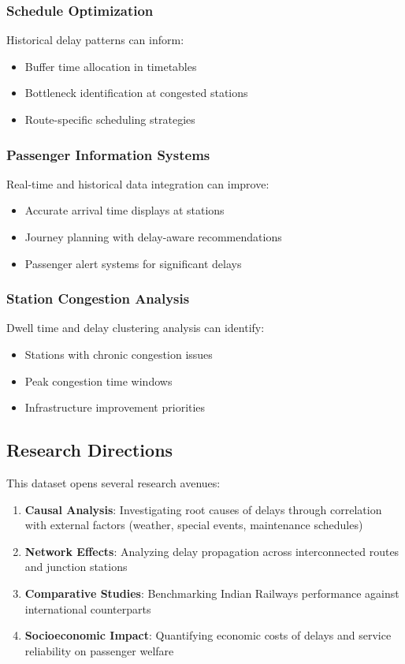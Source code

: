 \documentclass[11pt,a4paper]{article}
\begin{document}
\subsubsection{Schedule Optimization}
Historical delay patterns can inform:
\begin{itemize}
    \item Buffer time allocation in timetables
    \item Bottleneck identification at congested stations
    \item Route-specific scheduling strategies
\end{itemize}

\subsubsection{Passenger Information Systems}
Real-time and historical data integration can improve:
\begin{itemize}
    \item Accurate arrival time displays at stations
    \item Journey planning with delay-aware recommendations
    \item Passenger alert systems for significant delays
\end{itemize}

\subsubsection{Station Congestion Analysis}
Dwell time and delay clustering analysis can identify:
\begin{itemize}
    \item Stations with chronic congestion issues
    \item Peak congestion time windows
    \item Infrastructure improvement priorities
\end{itemize}

\subsection{Research Directions}

This dataset opens several research avenues:

\begin{enumerate}
    \item \textbf{Causal Analysis}: Investigating root causes of delays through correlation with external factors (weather, special events, maintenance schedules)
    \item \textbf{Network Effects}: Analyzing delay propagation across interconnected routes and junction stations
    \item \textbf{Comparative Studies}: Benchmarking Indian Railways performance against international counterparts
    \item \textbf{Socioeconomic Impact}: Quantifying economic costs of delays and service reliability on passenger welfare
\end{enumerate}
\end{document}
